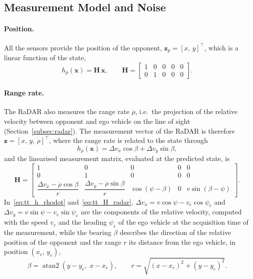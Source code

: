 \subsection{Measurement Model and Noise}
\label{subsec:tt_meas_model}

\paragraph{Position.} All the sensors provide the position of the opponent,
$\mathbf{z}_p = [x,\,y]^\top$, which is a linear function of the state,
\begin{equation}
    h_p(\mathbf{x}) = \mathbf{H}\,\mathbf{x},
    \qquad
    \mathbf{H} =
    \begin{bmatrix}
        1 & 0 & 0 & 0 & 0 \\
        0 & 1 & 0 & 0 & 0
    \end{bmatrix}.
    \label{eq:tt_h_pos}
\end{equation}


\paragraph{Range rate.} The RaDAR also measures the range rate $\dot\rho$, i.e.\ the
projection of the relative velocity between opponent and ego vehicle on the line of sight
(Section~\ref{subsec:radar}). The measurement vector of the RaDAR is therefore
$\mathbf{z} = [x,\,y,\,\dot\rho]^\top$, where the range rate is related to the state through
\begin{equation}
    h_{\dot\rho}(\mathbf{x}) = \Delta v_x\cos\beta + \Delta v_y\sin\beta,
    \label{eq:tt_h_rhodot}
\end{equation}
and the linearised measurement matrix, evaluated at the predicted state, is
\begin{equation}
    \mathbf{H} =
    \begin{bmatrix}
        1 & 0 & 0 & 0 & 0 \\[1ex]
        0 & 1 & 0 & 0 & 0 \\[1ex]
        \dfrac{\Delta v_x - \dot\rho\cos\beta}{r} &
        \dfrac{\Delta v_y - \dot\rho\sin\beta}{r} &
        \cos(\psi - \beta) & 0 & v\sin(\beta - \psi)
    \end{bmatrix}.
    \label{eq:tt_H_radar}
\end{equation}
In~\eqref{eq:tt_h_rhodot} and~\eqref{eq:tt_H_radar}, $\Delta v_x = v\cos\psi - v_e\cos\psi_e$
and $\Delta v_y = v\sin\psi - v_e\sin\psi_e$ are the components of the relative velocity,
computed with the speed $v_e$ and the heading $\psi_e$ of the ego vehicle at the acquisition
time of the measurement, while the bearing $\beta$ describes the direction of the relative
position of the opponent and the range $r$ its distance from the ego vehicle, in position
$(x_e,\,y_e)$,
\begin{equation}
    \beta = \operatorname{atan2}\left(y - y_e,\; x - x_e\right),
    \qquad
    r = \sqrt{(x - x_e)^2 + (y - y_e)^2}.
    \label{eq:tt_bearing}
\end{equation}

